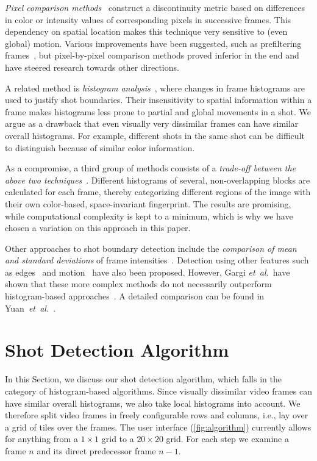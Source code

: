 \documentclass{acm_proc_article-sp}
\begin{document}
\emph{Pixel comparison methods}~\cite{Hampapur1994, Zhang1993} construct a discontinuity metric based on differences in color or intensity values of corresponding pixels in successive frames. This dependency on spatial location makes this technique very sensitive to (even global) motion. Various improvements have been suggested, such as prefiltering frames~\cite{Zhang1995}, but pixel-by-pixel comparison methods proved inferior in the end and have steered research towards other directions.

A related method is \emph{histogram analysis}~\cite{Smeaton1999}, where changes in frame histograms are used to justify shot boundaries. Their insensitivity to spatial information within a frame makes histograms less prone to partial and global movements in a shot. We argue as a drawback that even visually very dissimilar frames can have similar overall histograms. For example, different shots in the same shot can be difficult to distinguish because of similar color information.

As a compromise, a third group of methods consists of a \emph{trade-off between the above two techniques}~\cite{Ahmed1999}. Different histograms of several, non-overlapping blocks are calculated for each frame, thereby categorizing different regions of the image with their own color-based, space-invariant fingerprint. The results are promising, while computational complexity is kept to a minimum, which is why we have chosen a variation on this approach in this paper.

Other approaches to shot boundary detection include the \emph{comparison of mean and standard deviations} of frame intensities~\cite{Lienhart1999}. Detection using other features such as edges~\cite{Zabih1995} and motion~\cite{Bouthemy1997} have also been proposed. However, Gargi \emph{et~al.}\ have shown that these more complex methods do not necessarily outperform histogram-based approaches~\cite{Gargi2000}. A detailed comparison can be found in Yuan~\emph{et~al.}~\cite{Yuan2007}. 

\section{Shot Detection Algorithm} \label{sec:details-of-algo}
In this Section, we discuss our shot detection algorithm, which falls in the category of histogram-based algorithms.  Since visually dissimilar video frames can have similar overall histograms, we also take local histograms into account. 
We therefore split video frames in freely configurable rows and columns, i.e., lay over a grid of tiles over the frames. The user interface (\autoref{fig:algorithm}) currently allows for anything from a $\mathit{1} \times \mathit{1}$ grid to a $\mathit{20} \times \mathit{20}$ grid. For each step we examine a frame $\mathit{n}$ and its direct predecessor frame $\mathit{n - 1}$.
\end{document}
